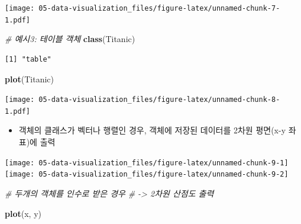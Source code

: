 \documentclass[
  11pt,
]{krantz}
\newenvironment{Shaded}{\begin{snugshade}}{\end{snugshade}}
\newcommand{\CommentTok}[1]{\textcolor[rgb]{0.37,0.37,0.37}{\textit{#1}}}
\newcommand{\KeywordTok}[1]{\textcolor[rgb]{0.27,0.27,0.27}{\textbf{#1}}}
\newcommand{\NormalTok}[1]{#1}
\newcommand{\OperatorTok}[1]{\textcolor[rgb]{0.43,0.43,0.43}{\textbf{#1}}}
\newcommand{\StringTok}[1]{\textcolor[rgb]{0.5,0.5,0.5}{#1}}
\providecommand{\tightlist}{%
  \setlength{\itemsep}{0pt}\setlength{\parskip}{0pt}}
\begin{document}
\texttt{[image: 05-data-visualization\_files/figure-latex/unnamed-chunk-7-1.pdf]}

\normalsize

\footnotesize

\begin{Shaded}
\begin{Highlighting}[]
\CommentTok{# 예시3: 테이블 객체}
\KeywordTok{class}\NormalTok{(Titanic)}
\end{Highlighting}
\end{Shaded}

\begin{verbatim}
[1] "table"
\end{verbatim}

\begin{Shaded}
\begin{Highlighting}[]
\KeywordTok{plot}\NormalTok{(Titanic)}
\end{Highlighting}
\end{Shaded}

\texttt{[image: 05-data-visualization\_files/figure-latex/unnamed-chunk-8-1.pdf]}

\normalsize

\begin{itemize}
\tightlist
\item
  객체의 클래스가 벡터나 행렬인 경우, 객체에 저장된 데이터를 2차원 평면(x-y 좌표)에 출력
\end{itemize}

\footnotesize

\begin{Shaded}
\end{Shaded}

\texttt{[image: 05-data-visualization\_files/figure-latex/unnamed-chunk-9-1]}
\texttt{[image: 05-data-visualization\_files/figure-latex/unnamed-chunk-9-2]}

\normalsize

\footnotesize

\begin{Shaded}
\begin{Highlighting}[]
\CommentTok{# 두개의 객체를 인수로 받은 경우}
\CommentTok{# -> 2차원 산점도 출력}

\KeywordTok{plot}\NormalTok{(x, y)}
\end{Highlighting}
\end{Shaded}
\end{document}
